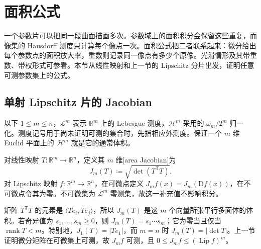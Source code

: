 
% 
% 

\section{面积公式}
\label{g3:sec:2003}

一个参数片可以把同一段曲面描画多次。参数域上的面积积分会保留这些重复，而像集的 Hausdorff 测度只计算每个像点一次。面积公式把二者联系起来：微分给出每个参数点的面积放大率，重数则记录同一像点有多少个原像。光滑情形及其带重数、带权形式可参看\cite[第8节，式(8.1)--(8.5)]{Simon1983}。本节从线性映射和上一节的 Lipschitz 分片出发，证明任意可测参数集上的公式。

\subsection{单射 Lipschitz 片的 Jacobian}
\label{g3:subsec:2003:01}
以下 \(1\le m\le n\)，\(\mathcal L^m\) 表示 \(\mathbb R^m\) 上的 Lebesgue 测度，\(\mathcal H^m\) 采用的 \(\omega_m/2^m\) 归一化。测度记号用于尚未证明可测的集合时，先指相应外测度。保证一个 \(m\) 维 Euclid 平面上的 \(\mathcal H^m\) 就是它的通常体积。

\begin{definition}\label{g3:def:area-jacobian}
	对线性映射 \(T:\mathbb R^m\to\mathbb R^n\)，定义其 \(m\) 维[area Jacobian]为
	\[
		J_m(T)\coloneqq\sqrt{\det(T^{\mathsf T}T)}.
	\]
	对 Lipschitz 映射 \(f:\mathbb R^m\to\mathbb R^n\)，在可微点定义 \(J_m f(x)=J_m(\mathrm Df(x))\)，在不可微点令其为零。不可微集为 \(\mathcal L^m\) 零测集，故这一补充值不影响积分。
\end{definition}

矩阵 \(T^{\mathsf T}T\) 的元素是 \(\langle Te_i,Te_j\rangle\)，所以 \(J_m(T)\) 是这 \(m\) 个向量所张平行多面体的体积。若奇异值为 \(s_1,\ldots,s_m\ge0\)，则 \(J_m(T)=s_1\cdots s_m\)；它为零当且仅当 \(\operatorname{rank}T<m\)。特别地，\(J_1(T)=|Te_1|\)，而 \(m=n\) 时 \(J_m(T)=|\det T|\)。上一节证明微分矩阵在可微集上可测，故 \(J_mf\) 可测，且 \(0\le J_mf\le(\operatorname{Lip}f)^m\)。

